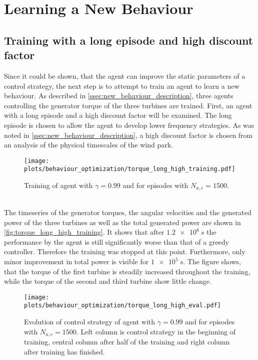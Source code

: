 \section{Learning a New Behaviour}
\subsection{Training with a long episode and high discount factor}
Since it could be shown, that the agent can improve the static parameters of a control strategy, the next step is to attempt to train an agent to learn a new behaviour. As described in \ref{ssec:new_behaviour_description}, three agents controlling the generator torque of the three turbines are trained. First, an agent with a long episode and a high discount factor will be examined. The long episode is chosen to allow the agent to develop lower frequency strategies. As was noted in \autoref{ssec:new_behaviour_description}, a high discount factor is chosen from an analysis of the physical timescales of the wind park.
\begin{figure}[h]
	\texttt{[image: plots/behaviour\_optimization/torque\_long\_high\_training.pdf]}
	\caption{ Training of agent with $\gamma=0.99$ and for episodes with $N_{a,e}=1500$.}
	\label{fig:torque_long_high_training}
\end{figure}\\
The timeseries of the generator torques, the angular velocities and the generated power of the three turbines as well as the total generated power are shown in \autoref{fig:torque_long_high_training}. It shows that after $\SI{1.2e6}{s}$ the performance by the agent is still significantly worse than that of a greedy controller. Therefore the training was stopped at this point. Furthermore, only minor improvement in total power is visible for $\SI{1e5}{s}$. The figure shows, that the torque of the first turbine is steadily increased throughout the training, while the torque of the second and third turbine show little change.
\begin{figure}[h]
	\texttt{[image: plots/behaviour\_optimization/torque\_long\_high\_eval.pdf]}
	\caption{Evolution of control strategy of agent with $\gamma=0.99$ and for episodes with $N_{a,e}=1500$. Left column is control strategy in the beginning of training, central column after half of the training and right column after training has finished.}
	\label{fig:torque_long_high_eval}
\end{figure} \\
